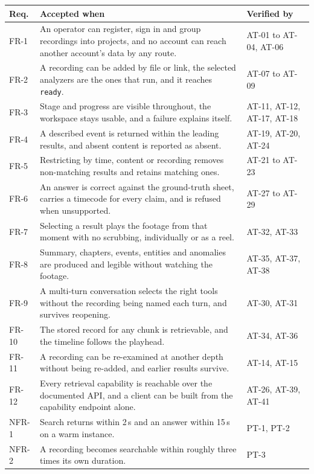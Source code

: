 \documentclass[11pt,a4paper]{article}
\begin{document}
\begin{table}[htbp]
\centering
\footnotesize
\begin{tabularx}{\textwidth}{@{}L{1.1cm}XL{2.5cm}@{}}
\toprule
\textbf{Req.} & \textbf{Accepted when} & \textbf{Verified by} \\
\midrule
FR-1 & An operator can register, sign in and group recordings into projects, and no account can reach another account's data by any route. & AT-01 to AT-04, AT-06 \\
FR-2 & A recording can be added by file or link, the selected analyzers are the ones that run, and it reaches \texttt{ready}. & AT-07 to AT-09 \\
FR-3 & Stage and progress are visible throughout, the workspace stays usable, and a failure explains itself. & AT-11, AT-12, AT-17, AT-18 \\
FR-4 & A described event is returned within the leading results, and absent content is reported as absent. & AT-19, AT-20, AT-24 \\
FR-5 & Restricting by time, content or recording removes non-matching results and retains matching ones. & AT-21 to AT-23 \\
FR-6 & An answer is correct against the ground-truth sheet, carries a timecode for every claim, and is refused when unsupported. & AT-27 to AT-29 \\
FR-7 & Selecting a result plays the footage from that moment with no scrubbing, individually or as a reel. & AT-32, AT-33 \\
FR-8 & Summary, chapters, events, entities and anomalies are produced and legible without watching the footage. & AT-35, AT-37, AT-38 \\
FR-9 & A multi-turn conversation selects the right tools without the recording being named each turn, and survives reopening. & AT-30, AT-31 \\
FR-10 & The stored record for any chunk is retrievable, and the timeline follows the playhead. & AT-34, AT-36 \\
FR-11 & A recording can be re-examined at another depth without being re-added, and earlier results survive. & AT-14, AT-15 \\
FR-12 & Every retrieval capability is reachable over the documented API, and a client can be built from the capability endpoint alone. & AT-26, AT-39, AT-41 \\
\midrule
NFR-1 & Search returns within 2\,s and an answer within 15\,s on a warm instance. & PT-1, PT-2 \\
NFR-2 & A recording becomes searchable within roughly three times its own duration. & PT-3 \\

\end{tabularx}
\end{table}
\end{document}
